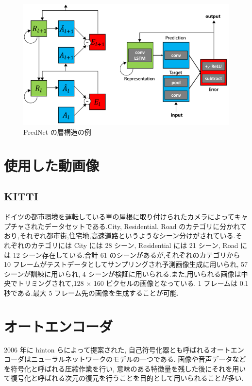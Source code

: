  \begin{figure}[hb]
\includegraphics[scale=0.4]{prednet.png}
 \caption{PredNet の層構造の例}
\end{figure}
\section{使用した動画像}
\subsection{KITTI}
ドイツの都市環境を運転している車の屋根に取り付けられたカメラによってキャプチャされたデータセットである.City, Residential, Road のカテゴリに分かれており,それぞれ都市街,住宅地,高速道路というようなシーン分けがされている.それぞれのカテゴリには City には 28 シーン, Residential には 21 シーン, Road には 12 シーン存在している.合計 61 のシーンがあるが,それぞれのカテゴリから 10 フレームがテストデータとしてサンプリングされ予測画像生成に用いられ, 57 シーンが訓練に用いられ, 4 シーンが検証に用いられる.また,用いられる画像は中央でトリミングされて,128 × 160 ピクセルの画像となっている. 1 フレームは 0.1 秒である.最大 5 フレーム先の画像を生成することが可能.
\newpage
\section{オートエンコーダ}
2006 年に hinton らによって提案された, 自己符号化器とも呼ばれるオートエンコーダはニューラルネットワークのモデルの一つである. 画像や音声データなどを符号化と呼ばれる圧縮作業を行い, 意味のある特徴量を残した後にそれを用いて復号化と呼ばれる次元の復元を行うことを目的として用いられることが多い.
